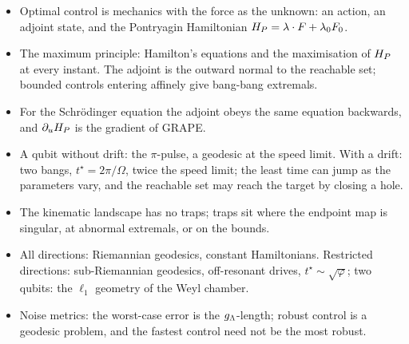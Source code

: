 \documentclass[handoutsbeamer.tex]{subfiles}
\begin{document}
\begin{frame}\mop{\footnotesize}
\begin{itemize}\setlength\itemsep{0.4em}
    \item Optimal control is mechanics with the force as the unknown: an action, an adjoint state, and the Pontryagin Hamiltonian $H_{P}=\lambda\cdot F+\lambda_0F_0$.
    \item The maximum principle: Hamilton's equations and the maximisation of $H_{P}$ at every instant. The adjoint is the outward normal to the reachable set; bounded controls entering affinely give bang-bang extremals.
    \item For the Schr\"odinger equation the adjoint obeys the same equation backwards, and $\partial_uH_{P}$ is the gradient of GRAPE.
    \item A qubit without drift: the $\pi$-pulse, a geodesic at the speed limit. With a drift: two bangs, $t^\star=2\pi/\Omega$, twice the speed limit; the least time can jump as the parameters vary, and the reachable set may reach the target by closing a hole.
    \item The kinematic landscape has no traps; traps sit where the endpoint map is singular, at abnormal extremals, or on the bounds.
    \item All directions: Riemannian geodesics, constant Hamiltonians. Restricted directions: sub-Riemannian geodesics, off-resonant drives, $t^\star\sim\sqrt\varphi$; two qubits: the $\ell_1$ geometry of the Weyl chamber.
    \item Noise metrics: the worst-case error is the $g_{\Lambda}$-length; robust control is a geodesic problem, and the fastest control need not be the most robust.
\end{itemize}
\end{frame}

\biblio
\end{document}
